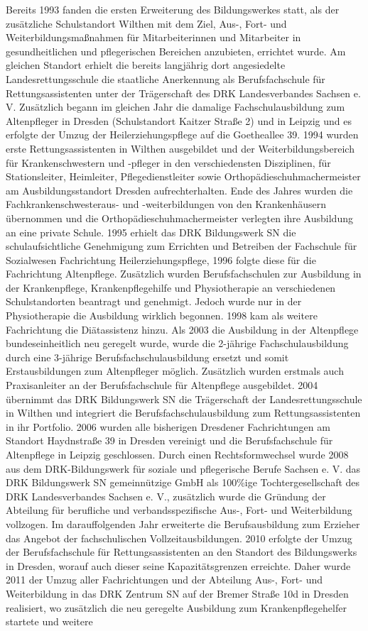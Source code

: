 Bereits 1993 fanden die ersten Erweiterung des Bildungswerkes statt, als der zusätzliche Schulstandort Wilthen mit dem Ziel, Aus-, Fort- und Weiterbildungsmaßnahmen für Mitarbeiterinnen und Mitarbeiter in gesundheitlichen und pflegerischen Bereichen anzubieten, errichtet wurde. Am gleichen Standort erhielt die bereits langjährig dort angesiedelte Landesrettungsschule die staatliche Anerkennung als Berufsfachschule für Rettungsassistenten unter der Trägerschaft des DRK Landesverbandes Sachsen e. V. Zusätzlich begann im gleichen Jahr die damalige Fachschulausbildung zum Altenpfleger in Dresden (Schulstandort Kaitzer Straße 2) und in Leipzig und es erfolgte der Umzug der Heilerziehungspflege auf die Goetheallee 39. 1994 wurden erste Rettungsassistenten in Wilthen ausgebildet und der Weiterbildungsbereich für Krankenschwestern und -pfleger in den verschiedensten Disziplinen, für Stationsleiter, Heimleiter, Pflegedienstleiter sowie Orthopädieschuhmachermeister am Ausbildungsstandort Dresden aufrechterhalten. Ende des Jahres wurden die Fachkrankenschwesteraus- und -weiterbildungen von den Krankenhäusern übernommen und die Orthopädieschuhmachermeister verlegten ihre Ausbildung an eine private Schule. 1995 erhielt das DRK Bildungswerk SN die schulaufsichtliche Genehmigung zum Errichten und Betreiben der Fachschule für Sozialwesen Fachrichtung Heilerziehungspflege, 1996 folgte diese für die Fachrichtung Altenpflege. Zusätzlich wurden Berufsfachschulen zur Ausbildung in der Krankenpflege, Krankenpflegehilfe und Physiotherapie an verschiedenen Schulstandorten beantragt und genehmigt. Jedoch wurde nur in der Physiotherapie die Ausbildung wirklich begonnen. 1998 kam als weitere Fachrichtung die Diätassistenz hinzu. Als 2003 die Ausbildung in der Altenpflege bundeseinheitlich neu geregelt wurde, wurde die 2-jährige Fachschulausbildung durch eine 3-jährige Berufsfachschulausbildung ersetzt und somit Erstausbildungen zum Altenpfleger möglich. Zusätzlich wurden erstmals auch Praxisanleiter an der Berufsfachschule für Altenpflege ausgebildet. 2004 übernimmt das DRK Bildungswerk SN die Trägerschaft der Landesrettungsschule in Wilthen und integriert die Berufsfachschulausbildung zum Rettungsassistenten in ihr Portfolio. 2006 wurden alle bisherigen Dresdener Fachrichtungen am Standort Haydnstraße 39 in Dresden vereinigt und die Berufsfachschule für Altenpflege in Leipzig geschlossen. Durch einen Rechtsformwechsel wurde 2008 aus dem DRK-Bildungswerk für soziale und pflegerische Berufe Sachsen e. V. das DRK Bildungswerk SN gemeinnützige GmbH als 100\%ige Tochtergesellschaft des DRK Landesverbandes Sachsen e. V., zusätzlich wurde die Gründung der Abteilung für berufliche und verbands\-spe\-zi\-fische Aus-,\- Fort-\- und Weiterbildung vollzogen. Im darauffolgenden Jahr erweiterte die Berufsausbildung zum Erzieher das Angebot der fachschulischen Vollzeitausbildungen. 2010 erfolgte der Umzug der Berufsfachschule für Rettungsassistenten an den Standort des Bildungswerks in Dresden, worauf auch dieser seine Kapazitätsgrenzen erreichte. Daher wurde 2011 der Umzug aller Fachrichtungen und der Abteilung Aus-,\- Fort-\- und Weiterbildung in das DRK Zentrum SN auf der Bremer Straße 10d in Dresden realisiert, wo zusätzlich die neu geregelte Ausbildung zum Krankenpflegehelfer startete und weitere 
